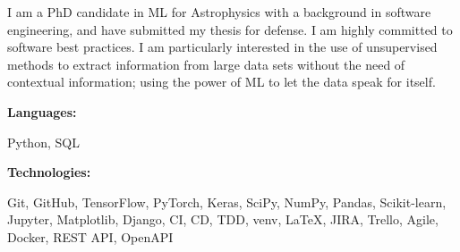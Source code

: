 \documentclass[9pt]{developercv} %
\begin{document}
\begin{minipage}[t]{0.46\textwidth}
	\vspace{-6pt}
 
    I am a PhD candidate in ML for Astrophysics with a background in software engineering, and have submitted my thesis for defense. I am highly committed to software best practices. I am particularly interested in the use of unsupervised methods to extract information from large data sets without the need of contextual information; using the power of ML to let the data speak for itself. \\
\end{minipage}
\hfill %
\begin{minipage}[t]{0.465\textwidth}
    \vspace{-6pt}
    
    \begin{minipage}[t]{0.2\textwidth}
        \textbf{Languages:}
    \end{minipage}
    \hfill
    \begin{minipage}[t]{0.73\textwidth}
      Python, SQL
    \end{minipage}
    \vspace{4mm}
    
    \begin{minipage}[t]{0.2\textwidth}
        \textbf{Technologies:}
    \end{minipage}
    \hfill
    \begin{minipage}[t]{0.73\textwidth}
      Git, GitHub, TensorFlow, PyTorch, Keras, SciPy, NumPy, Pandas, Scikit-learn, Jupyter, Matplotlib, Django, CI, CD, TDD, venv, LaTeX, JIRA, Trello, Agile, Docker, REST API, OpenAPI
    \end{minipage}
    
\end{minipage}
\end{document}
